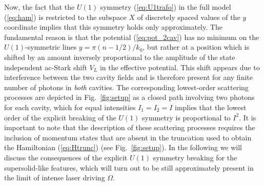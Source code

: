 \documentclass[12pt]{iopart}
\begin{document}
Now, the fact that the $U(1)$ symmetry
(\ref{eq:U1trafo}) in the full model (\ref{eq:ham}) is restricted
to the subspace $X$ of discretely spaced values of the $y$ coordinate
implies that this symmetry holds only approximately.
The fundamental reason is that the potential (\ref{eq:pot_2cav}) has no
minimum on the $U(1)$-symmetric lines $y=\pi(n-1/2)/k_0$, but rather
at a position which is shifted by an amount inversely proportional to
the amplitude of the state independent ac-Stark shift $V_L$ in the effective potential. This shift appears due to interference between the two
cavity fields and is therefore present for any finite number of photons in
\emph{both} cavities. The corresponding lowest-order scattering processes are
depicted in Fig.~\ref{fig:setup} as a closed path involving two
photons for each cavity, which for equal intensities $I_1=I_2=I$ implies that the
lowest order of the explicit breaking of the $U(1)$ symmetry is proportional to $I^2$. It is important to note that the description of these scattering
processes requires the inclusion of momentum states that are absent in
the truncation used to obtain the Hamiltonian (\ref{eq:Htrunc}) (see Fig.~\ref{fig:setup}).
In the following we will discuss the consequences of the explicit $U(1)$
symmetry breaking for the supersolid-like features, which will turn
out to be still approximately present in the limit of intense laser
driving $\Omega$.
\end{document}
